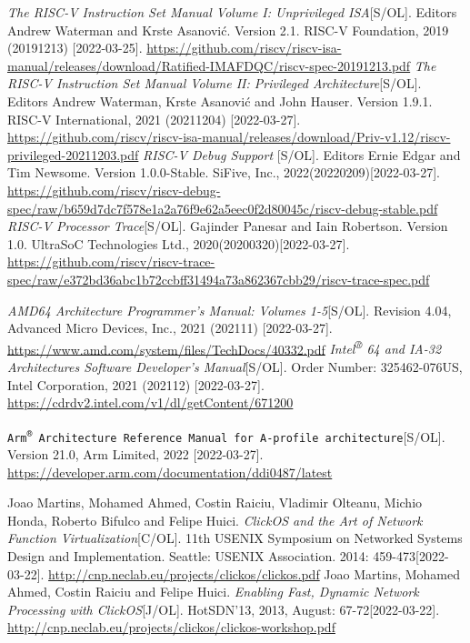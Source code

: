 \documentclass[UTF8,fontset=none,linespread=1.15]{ctexart}
\begin{document}
\begin{thebibliography}{99}
 \textit{The RISC-V Instruction Set Manual
Volume I: Unprivileged ISA}[S/OL]. Editors Andrew Waterman and Krste Asanović. Version 2.1. RISC-V Foundation, 2019 (20191213) [2022-03-25]. \url{https://github.com/riscv/riscv-isa-manual/releases/download/Ratified-IMAFDQC/riscv-spec-20191213.pdf}
 \textit{The RISC-V Instruction Set Manual
Volume II: Privileged Architecture}[S/OL]. Editors Andrew Waterman, Krste Asanović and John Hauser.
Version 1.9.1. RISC-V International, 2021 (20211204) [2022-03-27]. \url{https://github.com/riscv/riscv-isa-manual/releases/download/Priv-v1.12/riscv-privileged-20211203.pdf}
 \textit{RISC-V Debug Support
}[S/OL]. Editors Ernie Edgar and Tim Newsome. Version 1.0.0-Stable. SiFive, Inc., 2022(20220209)[2022-03-27]. \url{https://github.com/riscv/riscv-debug-spec/raw/b659d7dc7f578e1a2a76f9e62a5eec0f2d80045c/riscv-debug-stable.pdf}
 \textit{RISC-V Processor Trace}[S/OL]. Gajinder Panesar and
Iain Robertson. Version 1.0. UltraSoC Technologies Ltd., 2020(20200320)[2022-03-27]. \url{https://github.com/riscv/riscv-trace-spec/raw/e372bd36abc1b72ccbff31494a73a862367cbb29/riscv-trace-spec.pdf}

 \textit{AMD64 Architecture Programmer's Manual: Volumes 1-5}[S/OL]. Revision 4.04, Advanced Micro Devices, Inc., 2021 (202111) [2022-03-27]. \url{https://www.amd.com/system/files/TechDocs/40332.pdf}
 \textit{Intel\textsuperscript{®} 64 and IA-32 Architectures Software Developer’s Manual}[S/OL]. Order Number: 325462-076US, Intel Corporation, 2021 (202112) [2022-03-27]. \url{https://cdrdv2.intel.com/v1/dl/getContent/671200}

 \texttt{Arm\textsuperscript{®} Architecture Reference Manual
for A-profile architecture}[S/OL]. Version 21.0, Arm Limited, 2022 [2022-03-27]. \url{https://developer.arm.com/documentation/ddi0487/latest}

 Joao Martins, Mohamed Ahmed, Costin Raiciu, Vladimir Olteanu,
Michio Honda, Roberto Bifulco and Felipe Huici. \textit{ClickOS and the Art of Network Function Virtualization}[C/OL]. 11th USENIX Symposium on Networked Systems
Design and Implementation. Seattle: USENIX Association. 2014: 459-473[2022-03-22]. \url{http://cnp.neclab.eu/projects/clickos/clickos.pdf}
 Joao Martins, Mohamed Ahmed, Costin Raiciu and Felipe Huici.
\textit{Enabling Fast, Dynamic Network Processing with ClickOS}[J/OL]. HotSDN'13, 2013, August: 67-72[2022-03-22]. \url{http://cnp.neclab.eu/projects/clickos/clickos-workshop.pdf}


\end{thebibliography}
\end{document}
